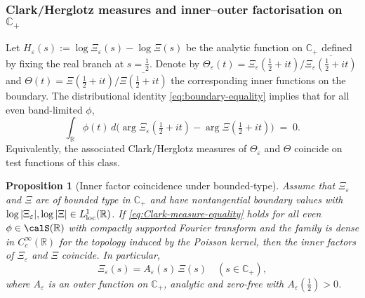 ﻿\documentclass[12pt,a4paper]{article}
\newtheorem{proposition}[theorem]{Proposition}
\theoremstyle{definition}
\theoremstyle{remark}
\newcommand{\CC}{\mathbb{C}}
\newcommand{\RR}{\mathbb{R}}
\begin{document}
\subsubsection*{Clark/Herglotz measures and inner--outer factorisation on $\CC_+$}
Let $H_\varepsilon(s):=\log \Xi_\varepsilon(s)-\log \Xi(s)$ be the analytic function on $\CC_+$ defined by fixing the real branch at $s=\tfrac12$.
Denote by $\Theta_\varepsilon(t)=\Xi_\varepsilon(\tfrac12+it)/\overline{\Xi_\varepsilon(\tfrac12+it)}$ and $\Theta(t)=\Xi(\tfrac12+it)/\overline{\Xi(\tfrac12+it)}$
the corresponding inner functions on the boundary. The distributional identity \eqref{eq:boundary-equality} implies that for all even band-limited $\phi$,
\begin{equation}\label{eq:Clark-measure-equality}
  \int_{\RR} \phi(t)\,d\bigl(\arg \Xi_\varepsilon(\tfrac12+it)-\arg \Xi(\tfrac12+it)\bigr)\;=\;0.
\end{equation}
Equivalently, the associated Clark/Herglotz measures of $\Theta_\varepsilon$ and $\Theta$ coincide on test functions of this class.

\begin{proposition}[Inner factor coincidence under bounded-type]\label{prop:inner}
Assume that $\Xi_\varepsilon$ and $\Xi$ are of bounded type in $\CC_+$ and have nontangential boundary values with $\log|\Xi_\varepsilon|, \log|\Xi|\in L^1_{\rm loc}(\RR)$.
If \eqref{eq:Clark-measure-equality} holds for all even $\phi\in\calS(\RR)$ with compactly supported Fourier transform and the family is dense in $C_c^\infty(\RR)$
for the topology induced by the Poisson kernel, then the inner factors of $\Xi_\varepsilon$ and $\Xi$ coincide. In particular,
\begin{equation}\label{eq:inner-equality-outer}
  \Xi_\varepsilon(s)=A_\varepsilon(s)\,\Xi(s)\quad (s\in\CC_+),
\end{equation}
where $A_\varepsilon$ is an outer function on $\CC_+$, analytic and zero-free with $A_\varepsilon(\tfrac12)>0$.
\end{proposition}
\end{document}

